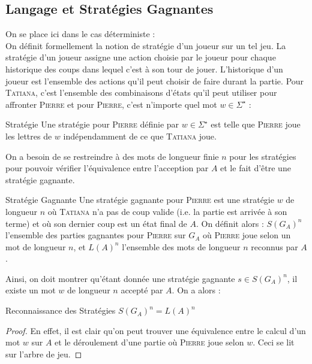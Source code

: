 \documentclass{cours}
\begin{document}
\subsection{Langage et Stratégies Gagnantes}
On se place ici dans le cas déterministe :\\
On définit formellement la notion de stratégie d'un joueur sur un tel jeu. La stratégie d'un joueur assigne une action choisie par le joueur pour chaque historique des coups dans lequel c'est à son tour de jouer. L'historique d'un joueur est l'ensemble des actions qu'il peut choisir de faire durant la partie. Pour \textsc{Tatiana}, c'est l'ensemble des combinaisons d'états qu'il peut utiliser pour affronter \textsc{Pierre} et pour \textsc{Pierre}, c'est n'importe quel mot $w \in \Sigma^{\star}$ :
\begin{définition}{Stratégie}{}
    Une stratégie pour \textsc{Pierre} définie par $w \in \Sigma^{\star}$ est telle que \textsc{Pierre} joue les lettres de $w$ indépendamment de ce que \textsc{Tatiana} joue.
\end{définition}
On a besoin de se restreindre à des mots de longueur finie $n$ pour les stratégies pour pouvoir vérifier l'équivalence entre l'acception par $A$ et le fait d'être une stratégie gagnante.
\begin{définition}{Stratégie Gagnante}{}
    Une stratégie gagnante pour \textsc{Pierre} est une stratégie $w$ de longueur $n$ où \textsc{Tatiana} n'a pas de coup valide (i.e. la partie est arrivée à son terme) et où son dernier coup est un état final de $A$.
    On définit alors : $S\left(G_{A}\right)^{n}$ l'ensemble des parties gagnantes pour \textsc{Pierre} sur $G_{A}$ où \textsc{Pierre} joue selon un mot de longueur $n$, et $L(A)^{n}$ l'ensemble des mots de longueur $n$ reconnus par $A$.
\end{définition}

Ainsi, on doit montrer qu'étant donnée une stratégie gagnante $s \in S\left(G_{A}\right)^{n}$, il existe un mot $w$ de longueur $n$ accepté par $A$.
On a alors :
\begin{théorème}{Reconnaissance des Stratégies}{}
    $S(G_{A})^{n} = L(A)^{n}$
\end{théorème}
\begin{proof}
    En effet, il est clair qu'on peut trouver une équivalence entre le calcul d'un mot $w$ sur $A$ et le déroulement d'une partie où \textsc{Pierre} joue selon $w$. Ceci se lit sur l'arbre de jeu.
\end{proof}
\end{document}
